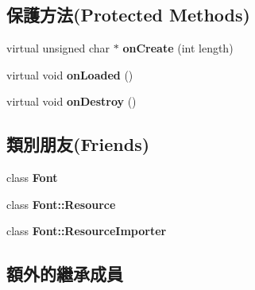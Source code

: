 \subsection*{保護方法(Protected Methods)}
\begin{DoxyCompactItemize}
\item 
virtual unsigned char $\ast$ {\bfseries on\+Create} (int length)\hypertarget{class_i_dream_sky_1_1_font_1_1_resource_afc4283638b7a8c1b8495d166242c13d1}{}\label{class_i_dream_sky_1_1_font_1_1_resource_afc4283638b7a8c1b8495d166242c13d1}

\item 
virtual void {\bfseries on\+Loaded} ()\hypertarget{class_i_dream_sky_1_1_font_1_1_resource_a247b305c5e2cd8c6963bbbcb4ae709a0}{}\label{class_i_dream_sky_1_1_font_1_1_resource_a247b305c5e2cd8c6963bbbcb4ae709a0}

\item 
virtual void {\bfseries on\+Destroy} ()\hypertarget{class_i_dream_sky_1_1_font_1_1_resource_acab56e1548e599298f740b79b7d6a882}{}\label{class_i_dream_sky_1_1_font_1_1_resource_acab56e1548e599298f740b79b7d6a882}

\end{DoxyCompactItemize}
\subsection*{類別朋友(Friends)}
\begin{DoxyCompactItemize}
\item 
class {\bfseries Font}\hypertarget{class_i_dream_sky_1_1_font_1_1_resource_ad564b94b59dc295de3dfc4415d95cca8}{}\label{class_i_dream_sky_1_1_font_1_1_resource_ad564b94b59dc295de3dfc4415d95cca8}

\item 
class {\bfseries Font\+::\+Resource}\hypertarget{class_i_dream_sky_1_1_font_1_1_resource_aed1576435da2fd6be67b0972d456c130}{}\label{class_i_dream_sky_1_1_font_1_1_resource_aed1576435da2fd6be67b0972d456c130}

\item 
class {\bfseries Font\+::\+Resource\+Importer}\hypertarget{class_i_dream_sky_1_1_font_1_1_resource_adcf31f02b1c16e69102f4d80f9a06dfd}{}\label{class_i_dream_sky_1_1_font_1_1_resource_adcf31f02b1c16e69102f4d80f9a06dfd}

\end{DoxyCompactItemize}
\subsection*{額外的繼承成員}


